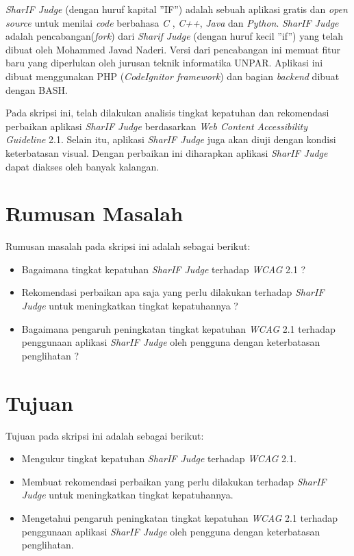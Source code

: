 \textit{SharIF Judge} \cite{SharIF_Judge} (dengan huruf kapital ''IF'') adalah sebuah aplikasi gratis dan \textit{open source} untuk menilai \textit{code} berbahasa \textit{C} , \textit{C++}, \textit{Java} dan \textit{Python}. \textit{SharIF Judge} adalah pencabangan(\textit{fork}) dari \textit{Sharif Judge} \cite{Sharif_Judge_Original} (dengan huruf kecil ''if'') yang telah dibuat oleh Mohammed Javad Naderi. Versi dari pencabangan ini memuat fitur baru yang diperlukan oleh jurusan teknik informatika UNPAR. Aplikasi ini dibuat menggunakan PHP (\textit{CodeIgnitor framework})\cite{Codeigniter} dan bagian \textit{backend} dibuat dengan BASH.

Pada skripsi ini, telah dilakukan analisis tingkat kepatuhan dan rekomendasi perbaikan aplikasi \textit{SharIF Judge} berdasarkan \textit{Web Content Accessibility Guideline} 2.1. Selain itu, aplikasi \textit{SharIF Judge} juga akan diuji dengan kondisi keterbatasan visual. Dengan perbaikan ini diharapkan aplikasi \textit{SharIF Judge} dapat diakses oleh banyak kalangan.

\section{Rumusan Masalah}
\label{sec:rumusan}

Rumusan masalah pada skripsi ini adalah sebagai berikut: 

\begin{itemize}
	\item Bagaimana tingkat kepatuhan \textit{SharIF Judge} terhadap \textit{WCAG} 2.1 ?
	\item Rekomendasi perbaikan apa saja yang perlu dilakukan terhadap \textit{SharIF Judge} untuk meningkatkan tingkat kepatuhannya ?
	\item Bagaimana pengaruh peningkatan tingkat kepatuhan \textit{WCAG} 2.1 terhadap penggunaan aplikasi \textit{SharIF Judge} oleh pengguna dengan keterbatasan penglihatan ?
\end{itemize}

\section{Tujuan}
\label{sec:tujuan}

Tujuan pada skripsi ini adalah sebagai berikut: 

\begin{itemize}
	\item Mengukur tingkat kepatuhan \textit{SharIF Judge} terhadap \textit{WCAG} 2.1.
	\item Membuat rekomendasi perbaikan yang perlu dilakukan terhadap \textit{SharIF Judge} untuk meningkatkan tingkat kepatuhannya.
	\item Mengetahui pengaruh peningkatan tingkat kepatuhan \textit{WCAG} 2.1 terhadap penggunaan aplikasi \textit{SharIF Judge} oleh pengguna dengan keterbatasan penglihatan.
\end{itemize} 


